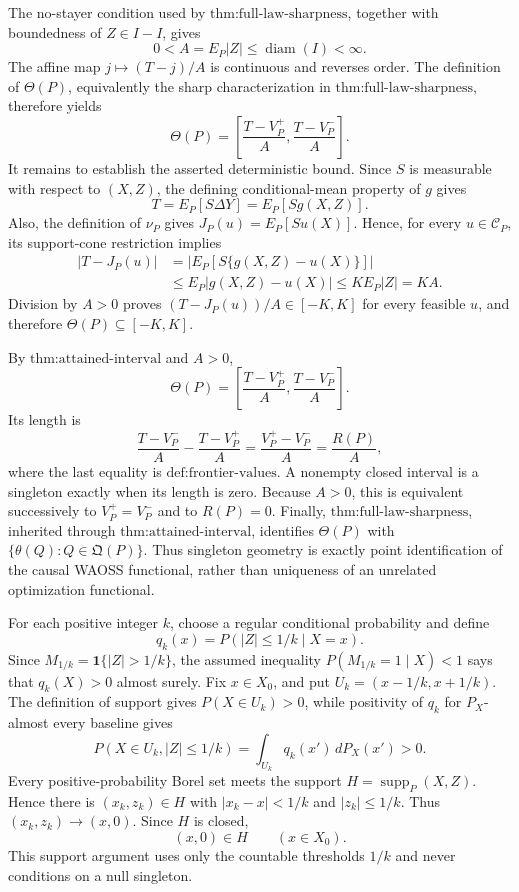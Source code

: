 The no-stayer condition used by \(\text{thm:full-law-sharpness}\), together with boundedness of \(Z\in I-I\), gives
\[
 0<A=E_P|Z|\leq\operatorname{diam}(I)<\infty.
\]
The affine map \(j\mapsto(T-j)/A\) is continuous and reverses order.  The definition of \(\Theta(P)\), equivalently the sharp characterization in \(\text{thm:full-law-sharpness}\), therefore yields
\[
 \Theta(P)=
 \left[\frac{T-V_P^+}{A},\frac{T-V_P^-}{A}\right].
\]
It remains to establish the asserted deterministic bound.  Since \(S\) is measurable with respect to \((X,Z)\), the defining conditional-mean property of \(g\) gives
\[
 T=E_P[S\Delta Y]=E_P[Sg(X,Z)].
\]
Also, the definition of \(\nu_P\) gives \(J_P(u)=E_P[Su(X)]\).  Hence, for every \(u\in\mathcal C_P\), its support-cone restriction implies
\[
 \begin{aligned}
 |T-J_P(u)|
 &=\left|E_P[S\{g(X,Z)-u(X)\}]\right|\\
 &\leq E_P|g(X,Z)-u(X)|
 \leq K E_P|Z|=KA.
 \end{aligned}
\]
Division by \(A>0\) proves \((T-J_P(u))/A\in[-K,K]\) for every feasible \(u\), and therefore \(\Theta(P)\subseteq[-K,K]\).

By \(\text{thm:attained-interval}\) and \(A>0\),
\[
 \Theta(P)=
 \left[\frac{T-V_P^+}{A},\frac{T-V_P^-}{A}\right].
\]
Its length is
\[
 \frac{T-V_P^-}{A}-\frac{T-V_P^+}{A}
 =\frac{V_P^+-V_P^-}{A}
 =\frac{R(P)}{A},
\]
where the last equality is \(\text{def:frontier-values}\).  A nonempty closed interval is a singleton exactly when its length is zero.  Because \(A>0\), this is equivalent successively to \(V_P^+=V_P^-\) and to \(R(P)=0\).  Finally, \(\text{thm:full-law-sharpness}\), inherited through \(\text{thm:attained-interval}\), identifies \(\Theta(P)\) with \(\{\theta(Q):Q\in\mathfrak Q(P)\}\).  Thus singleton geometry is exactly point identification of the causal WAOSS functional, rather than uniqueness of an unrelated optimization functional.

For each positive integer \(k\), choose a regular conditional probability and define
\[
 q_k(x)=P(|Z|\leq 1/k\mid X=x).
\]
Since \(M_{1/k}=\mathbf 1\{|Z|>1/k\}\), the assumed inequality \(P(M_{1/k}=1\mid X)<1\) says that \(q_k(X)>0\) almost surely.  Fix \(x\in X_0\), and put \(U_k=(x-1/k,x+1/k)\).  The definition of support gives \(P(X\in U_k)>0\), while positivity of \(q_k\) for \(P_X\)-almost every baseline gives
\[
 P(X\in U_k,|Z|\leq1/k)
 =\int_{U_k}q_k(x')\,dP_X(x')>0.
\]
Every positive-probability Borel set meets the support \(H=\operatorname{supp}_P(X,Z)\).  Hence there is \((x_k,z_k)\in H\) with \(|x_k-x|<1/k\) and \(|z_k|\leq1/k\).  Thus \((x_k,z_k)\to(x,0)\).  Since \(H\) is closed,
\[
 (x,0)\in H\qquad(x\in X_0).
\]
This support argument uses only the countable thresholds \(1/k\) and never conditions on a null singleton.

